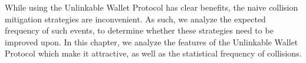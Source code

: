 While using the Unlinkable Wallet Protocol has clear benefits, the naive collision mitigation strategies are inconvenient.
As such, we analyze the expected frequency of such events, to determine whether these strategies need to be improved upon.
In this chapter, we analyze the features of the Unlinkable Wallet Protocol which make it attractive,
    as well as the statistical frequency of collisions.
